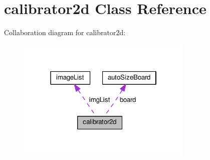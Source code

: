 \hypertarget{classcalibrator2d}{}\section{calibrator2d Class Reference}
\label{classcalibrator2d}


Collaboration diagram for calibrator2d\+:\nopagebreak
\begin{figure}[H]
\begin{center}
\leavevmode
\includegraphics[width=238pt]{classcalibrator2d__coll__graph}
\end{center}
\end{figure}
